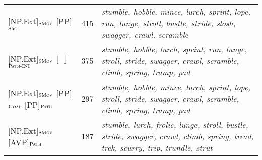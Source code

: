 \documentclass[output=paper,colorlinks,citecolor=brown]{langscibook}
\begin{document}
\begin{table}
\begin{tabularx}{\textwidth}{lrQ}
{[NP.Ext]}$_{\text{\textsc{SMov}}}$ {[PP]}$_{\text{\textsc{Src}}}$  & 415 & \textit{stumble, hobble, mince, lurch, sprint, lope, run, lunge, stroll, bustle, stride, slosh, swagger, crawl, scramble%
}\\

{[NP.Ext]}$_{\text{\textsc{SMov}}}$   {[\_]}$_{\text{\textsc{Path-INI}}}$  & 375 & \textit{stumble, hobble, lurch, sprint, run, lunge, stroll, stride, swagger, crawl, scramble, climb, spring, tramp, pad%
}\\

{[NP.Ext]}$_{\text{\textsc{SMov}}}$ {[PP]}$_{\text{\textsc{Goal}}}$ {[PP]}$_{\text{\textsc{Path}}}$  & 297 & \textit{stumble, hobble, mince, lurch, sprint, lope, stroll, stride, swagger, crawl, scramble, climb, spring, tramp, pad%
}\\

{[NP.Ext]}$_{\text{\textsc{SMov}}}$ {[AVP]}$_{\text{\textsc{Path}}}$  & 187 & \textit{stumble, lurch, frolic, lunge, stroll, bustle, stride, swagger, crawl, climb, spring, tread, trek, scurry, trip, trundle, strut%
}\\


\end{tabularx}
\end{table}
\end{document}
